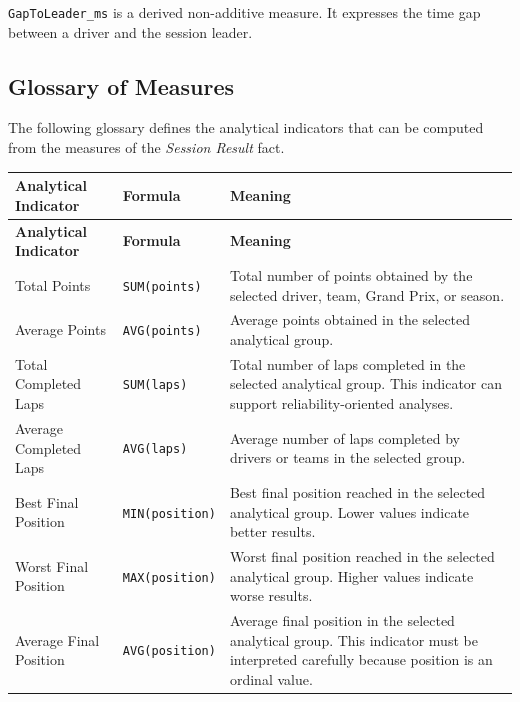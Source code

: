 \documentclass[a4paper,11pt]{article}
\begin{document}
	\texttt{GapToLeader\_ms} is a derived non-additive measure. It expresses the time gap
	between a driver and the session leader. 
	
	\subsection{Glossary of Measures}
	
	The following glossary defines the analytical indicators that can be computed from the
	measures of the \textit{Session Result} fact.
	
	\begin{longtable}{|p{4.5cm}|p{5.2cm}|p{6cm}|}
		\hline
		\textbf{Analytical Indicator} & \textbf{Formula} & \textbf{Meaning} \\
		\hline
		\endfirsthead
		
		\hline
		\textbf{Analytical Indicator} & \textbf{Formula} & \textbf{Meaning} \\
		\hline
		\endhead
		
		Total Points
		& \texttt{SUM(points)}
		& Total number of points obtained by the selected driver, team, Grand Prix, or
		season. \\
		\hline
		
		Average Points
		& \texttt{AVG(points)}
		& Average points obtained in the selected analytical group. \\
		\hline
		
		Total Completed Laps
		& \texttt{SUM(laps)}
		& Total number of laps completed in the selected analytical group. This indicator
		can support reliability-oriented analyses. \\
		\hline
		
		Average Completed Laps
		& \texttt{AVG(laps)}
		& Average number of laps completed by drivers or teams in the selected group. \\
		\hline
		
		Best Final Position
		& \texttt{MIN(position)}
		& Best final position reached in the selected analytical group. Lower values indicate
		better results. \\
		\hline
		
		Worst Final Position
		& \texttt{MAX(position)}
		& Worst final position reached in the selected analytical group. Higher values indicate
		worse results. \\
		\hline
		
		Average Final Position
		& \texttt{AVG(position)}
		& Average final position in the selected analytical group. This indicator must be
		interpreted carefully because position is an ordinal value. \\
		\hline
		

\end{longtable}
\end{document}

